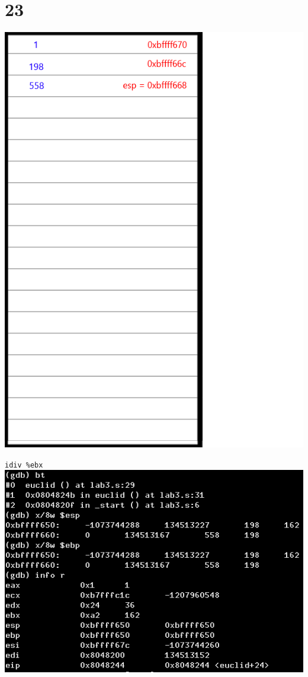 \documentclass{article}
\begin{document}
\section*{23}
\begin{minipage}{5cm}
\includegraphics[scale=0.3]{s3.png}
\end{minipage}
\begin{minipage}{8cm}
\verb|idiv %ebx|\\
\includegraphics[scale=0.4]{bxi23.png} \\
\end{minipage}
\clearpage
\end{document}
